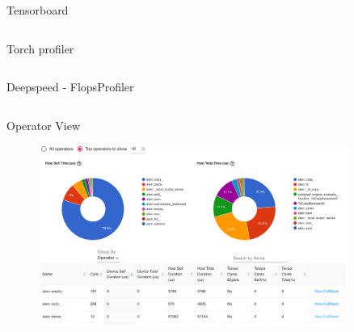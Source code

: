 \documentclass[compress,aspectratio=169]{beamer}
\begin{document}
\begin{frame}[fragile]{Tensorboard}
        \footnotesize\inputminted[xleftmargin=1em,linenos,fontsize=\scriptsize, highlightlines={1,3,9-12,14-16}]{python}{../../data/tensorboard.py}
\end{frame}

\begin{frame}[fragile]{Torch profiler}
        \footnotesize\inputminted[xleftmargin=1em,linenos,fontsize=\scriptsize, highlightlines={4-10,14,15}]{python}{../../data/profiler-torch.py}
\end{frame}

\begin{frame}[fragile]{Deepspeed - FlopsProfiler}
        \footnotesize\inputminted[xleftmargin=1em,linenos,fontsize=\scriptsize, highlightlines={1,3,4,8,9,11-18}]{python}{../../data/deepspeed.py}
\end{frame}

\begin{frame}{Operator View}
    \vspace{-1em}
\begin{center}
    \begin{figure}
        \includegraphics[width=0.9\textwidth]{../../data/scap_gtx1080_profiler-torch_batch-size-64_14650758_operator-view}
    \end{figure}
    \end{center}
\end{frame}
\end{document}
